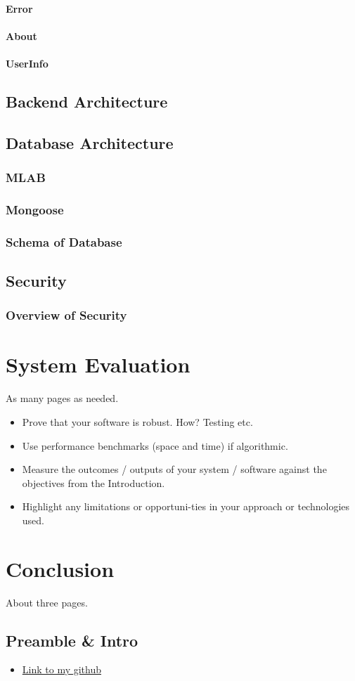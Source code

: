 \subsubsection{Error}
\subsubsection{About}
\subsubsection{UserInfo}

\section{Backend Architecture}

\section{Database Architecture}
\subsection{MLAB}
\subsection{Mongoose}
\subsection{Schema of Database}
\section{Security}
\subsection{Overview of Security}

\chapter{System Evaluation}
As many pages as needed.
\begin{itemize}
\item Prove that your software is robust. How? Testing etc.
\item Use performance benchmarks (space and time) if algorithmic.
\item Measure the outcomes / outputs of your system / software against the objectives from the Introduction.
\item Highlight any limitations or opportuni-ties in your approach or technologies used.
\end{itemize}

\chapter{Conclusion}
About three pages.
\begin{appendices}
\chapter{Preamble \& Intro}
\begin{itemize}
\item \href{https://github.com/Ultan-Kearns/AppliedProject}{Link to my github}
\end{itemize}
\end{appendices}



